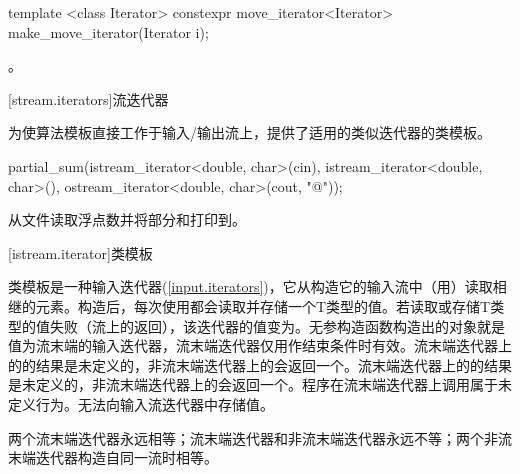 %
\begin{itemdecl}
template <class Iterator>
constexpr move_iterator<Iterator> make_move_iterator(Iterator i);
\end{itemdecl}

\begin{itemdescr}
\pnum
\returns {}。
\end{itemdescr}

[stream.iterators]{流迭代器}

\pnum
为使算法模板直接工作于输入/输出流上，提供了适用的类似迭代器的类模板。

\enterexample
\begin{codeblock}
partial_sum(istream_iterator<double, char>(cin),
  istream_iterator<double, char>(),
  ostream_iterator<double, char>(cout, "@\textbackslash@n"));
\end{codeblock}

从文件读取浮点数并将部分和打印到。
\exitexample

[istream.iterator]{类模板}

\pnum
{}%
类模板是一种输入迭代器(\ref{input.iterators})，它从构造它的输入流中（用）读取相继的元素。构造后，每次使用\tcode{++}都会读取并存储一个T类型的值。若读取或存储T类型的值失败（流上的返回），该迭代器的值变为。无参构造函数构造出的对象就是值为流末端的输入迭代器，流末端迭代器仅用作结束条件时有效。流末端迭代器上的的结果是未定义的，非流末端迭代器上的会返回一个。流末端迭代器上的的结果是未定义的，非流末端迭代器上的会返回一个。程序在流末端迭代器上调用属于未定义行为。无法向输入流迭代器中存储值。

\pnum
两个流末端迭代器永远相等；流末端迭代器和非流末端迭代器永远不等；两个非流末端迭代器构造自同一流时相等。

